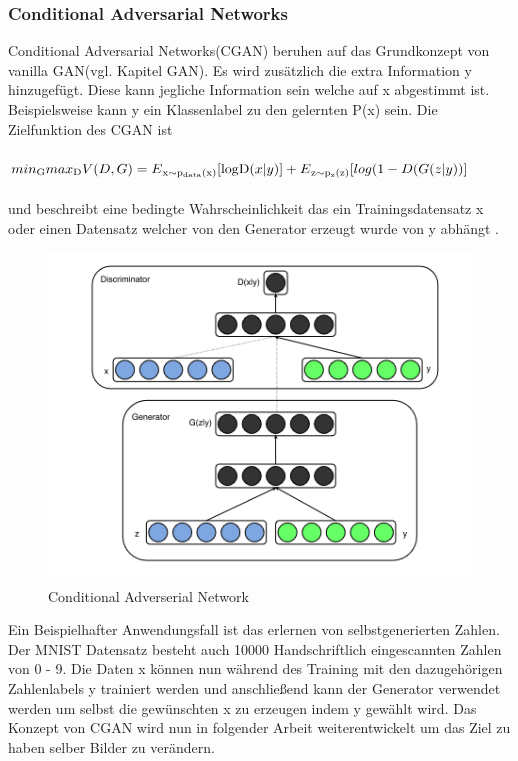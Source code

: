 \documentclass{llncs}
\begin{document}
\subsubsection{Conditional Adversarial Networks}

Conditional Adversarial Networks(CGAN) beruhen auf das Grundkonzept von vanilla GAN(vgl. Kapitel GAN). Es wird zusätzlich die extra Information y hinzugefügt. Diese kann jegliche Information sein welche auf x abgestimmt ist. Beispielsweise kann y ein Klassenlabel zu den gelernten P(x) sein. Die Zielfunktion des CGAN ist
\\\\
\begin{math}
min\textsubscript{G} max\textsubscript{D}V(D,G)=E\textsubscript{x$\sim$p\textsubscript{data}(x)}[\log $D$(x|y)]  + E\textsubscript{z$\sim$p\textsubscript{z}(z)}[log(1-D(G(z|y))]           
\end{math}
\\\\    
und beschreibt eine  bedingte Wahrscheinlichkeit das ein Trainingsdatensatz x oder einen Datensatz welcher von den Generator erzeugt wurde von y abhängt \cite{cgan}. 
\begin{figure}[htbp] 
	\centering
	\includegraphics[width=1.0\textwidth]{cgan.png}
	\caption{Conditional Adverserial Network}
	\label{fig:Bild8}
\end{figure}

Ein Beispielhafter Anwendungsfall ist das erlernen von selbstgenerierten Zahlen. Der MNIST Datensatz besteht auch 10000 Handschriftlich eingescannten Zahlen von 0 - 9. Die Daten x können nun während des Training mit den dazugehörigen Zahlenlabels y trainiert werden und anschließend kann der Generator verwendet werden um selbst die gewünschten x zu erzeugen indem y gewählt wird\cite{cgan}. Das Konzept von CGAN wird nun in folgender Arbeit weiterentwickelt um das Ziel zu haben selber Bilder zu verändern. 
\end{document}
